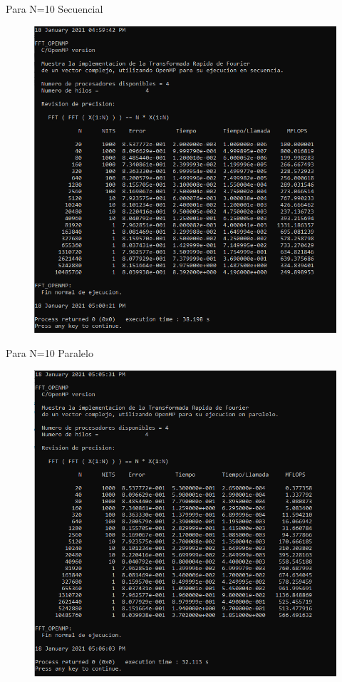 \documentclass{report}
\begin{document}
\clearpage

Para N=10 Secuencial

\begin{figure}[h!]
    \centering
    \includegraphics[scale=.8]{Images/FFT_Sec_10.png}
    \label{Secuencial 1.2}
\end{figure}

\clearpage

Para N=10 Paralelo\medskip

\begin{figure}[h!]
    \centering
    \includegraphics[scale=.8]{Images/FFT_Par_10.png}
    \label{Paralelo 1.2}
\end{figure}
\end{document}
